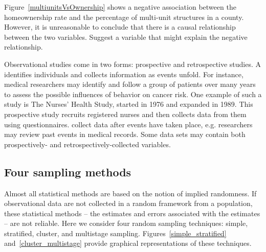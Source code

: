 \begin{exercisewrap}
\begin{nexercise}
Figure~\ref{multiunitsVsOwnership} shows a negative association
between the homeownership rate and the percentage of multi-unit
structures in a county.
However, it is unreasonable to conclude that there is a causal
relationship between the two variables.
Suggest a variable that might explain the negative
relationship.\footnotemark
\end{nexercise}
\end{exercisewrap}

Observational studies come in two forms:
prospective and retrospective studies.
A  identifies individuals
and collects information as events unfold.
For instance, medical researchers may identify and follow
a group of patients over many years to assess
the possible influences of behavior on cancer risk.
One example of such a study is The Nurses' Health Study,
started in 1976 and expanded in 1989.
This prospective study recruits registered nurses and then
collects data from them using questionnaires.
collect data after events have taken place,
e.g. researchers may review past events in medical records.
Some data sets may contain both prospectively- and
retrospectively-collected variables.


\subsection{Four sampling methods}
\label{fourSamplingMethods}
\label{threeSamplingMethods}

Almost all statistical methods are based on the notion of implied randomness. If observational data are not collected in a random framework from a population, these statistical methods -- the estimates and errors associated with the estimates -- are not reliable. Here we consider four random sampling techniques: simple, stratified, cluster, and multistage sampling. Figures~\ref{simple_stratified} and~\ref{cluster_multistage} provide graphical representations of these techniques.

